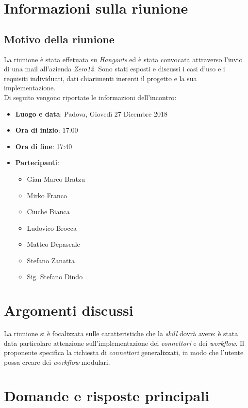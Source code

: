 \documentclass[a4paper,12pt]{article}
\begin{document}
	\cleardoublepage
	\pagestyle{mymain}
	
	\tableofcontents
	\cleardoublepage

	\section{Informazioni sulla riunione}
	\subsection{Motivo della riunione}
	La riunione è stata effetuata su  \textit{Hangouts} ed è stata convocata attraverso l'invio di una mail all'azienda  \textit{Zero12}. Sono stati esposti e discussi i casi d'uso e i requisiti individuati, dati chiarimenti inerenti il progetto e la sua implementazione.\\
	Di seguito vengono riportate le informazioni dell'incontro:
	\begin{itemize}
		\item \textbf{Luogo e data}: Padova, Giovedì 27 Dicembre 2018
		\item \textbf{Ora di inizio}: 17:00
		\item \textbf{Ora di fine}: 17:40
		\item \textbf{Partecipanti}:  
		\begin{itemize}
			\item Gian Marco Bratzu
			\item Mirko Franco
			\item Ciuche Bianca
			\item Ludovico Brocca
			\item Matteo Depascale
			\item Stefano Zanatta
			\item Sig. Stefano Dindo
		\end{itemize}
	\end{itemize}

	\section{Argomenti discussi}
	La riunione si è focalizzata sulle caratteristiche che la  \textit{skill} dovrà avere: è stata data particolare attenzione sull'implementazione dei \textit{connettori} e dei \textit{workflow}. Il proponente specifica la richiesta di \textit{connettori} generalizzati, in modo che l'utente possa creare dei \textit{workflow} modulari.
	\section{Domande e risposte principali}
\end{document}
